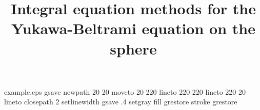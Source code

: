 %
%
%
%
%
\begin{filecontents*}{example.eps}
gsave
newpath
  20 20 moveto
  20 220 lineto
  220 220 lineto
  220 20 lineto
closepath
2 setlinewidth
gsave
  .4 setgray fill
grestore
stroke
grestore
\end{filecontents*}
%
\RequirePackage{fix-cm}
%
\documentclass[smallcondensed]{svjour3}     %
%
\smartqed  %
%
\usepackage{graphicx}
%
%
\usepackage{geometry,enumerate,datetime}                
\usepackage{graphicx}
\usepackage{amssymb,amsmath}
\usepackage{epstopdf}
\usepackage{array}
\usepackage{subfigure}
\usepackage{tensor,color}
\usepackage{tikz,pgfplots}
%
\newcommand{\todo}[1]{ \fbox{{\bf TODO:} \color{red} #1}}
\newcommand{\lap}{\bigtriangleup}
\newcommand{\C}{C_k}
\renewcommand{\S} {\mathcal{S}}
\newcommand{\bigO} {\mathcal{O}}
\newcommand{\p}{\partial}
\newcommand{\e}{\varepsilon}
\newcommand{\s}{\ss}
\newcommand{\R}{I \! \! R^3}
\renewcommand{\H}{\mathcal{H}}
\newcommand{\pderiv}[2]{\frac{\partial #1}{\partial #2}}
%
%



\title{Integral equation methods for the Yukawa-Beltrami equation on
the sphere 
}


